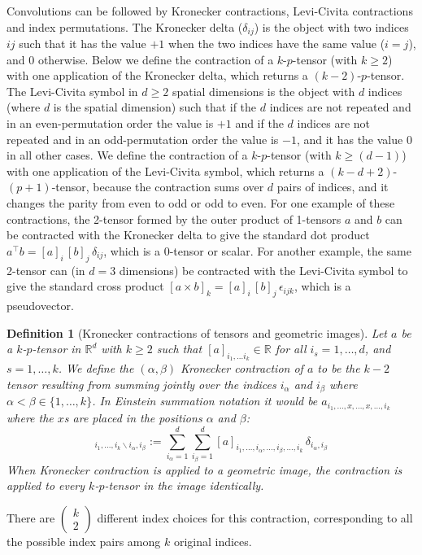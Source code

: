 \documentclass{article}
\theoremstyle{plain}
\newtheorem{definition}{Definition}
\renewcommand{\choose}[2]{\begin{pmatrix}{#1}\\{#2}\end{pmatrix}}
\begin{document}
Convolutions can be followed by Kronecker contractions, Levi-Civita contractions and index permutations.
The Kronecker delta ($\delta_{ij}$) is the object with two indices $ij$ such that it has the value $+1$ when the two indices have the same value ($i=j$), and $0$ otherwise.
Below we define the contraction of a $k$-$p$-tensor (with $k\geq 2$) with one application of the Kronecker delta, which returns a $(k-2)$-$p$-tensor.
The Levi-Civita symbol in $d\geq 2$ spatial dimensions is the object with $d$ indices (where $d$ is the spatial dimension) such that if the $d$ indices are not repeated and in an even-permutation order the value is $+1$ and if the $d$ indices are not repeated and in an odd-permutation order the value is $-1$, and it has the value $0$ in all other cases.
We define the contraction of a $k$-$p$-tensor (with $k\geq (d-1)$) with one application of the Levi-Civita symbol, which returns a $(k-d+2)$-$(p+1)$-tensor, because the contraction sums over $d$ pairs of indices, and it changes the parity from even to odd or odd to even.
For one example of these contractions, the 2-tensor formed by the outer product of 1-tensors $a$ and $b$ can be contracted with the Kronecker delta to give the standard dot product $a^\top b = [a]_i\,[b]_j\,\delta_{ij}$, which is a 0-tensor or scalar.
For another example, the same 2-tensor can (in $d=3$ dimensions) be contracted with the Levi-Civita symbol to give the standard cross product
$[a\times b]_k = [a]_i\,[b]_j\,\epsilon_{ijk}$, which is a pseudovector.

\begin{definition}[Kronecker contractions of tensors and geometric images]
Let $a$ be a $k$-$p$-tensor in $\mathbb R^d$ with $k\geq 2$ such that $[a]_{i_1,\ldots i_k}\in \mathbb R$ for all $i_s = 1,\ldots, d$, and $s=1,\ldots, k$. We define the $(\alpha,\beta)$ Kronecker contraction of $a$ to be the $k-2$ tensor resulting from summing jointly over the indices $i_\alpha$ and $i_\beta$ where $\alpha < \beta \in\{1,\ldots, k\}$. In Einstein summation notation it would be $a_{i_1, \ldots, x, \ldots , x, \ldots, i_k}$ where the $x$s are placed in the positions $\alpha$ and $\beta$:
\begin{equation}
[a^{(\alpha,\beta)}]_{i_1, \ldots, i_k \backslash i_\alpha,i_\beta} := \sum_{i_\alpha=1}^d \sum_{i_\beta=1}^d [a]_{i_1, \ldots, i_\alpha,\ldots,i_\beta,\ldots, i_k}\,\delta_{i_\alpha, i_\beta}
\end{equation}
When Kronecker contraction is applied to a geometric image, the contraction is applied to every $k$-$p$-tensor in the image identically.
\end{definition}
There are $\choose{k}{2}$ different index choices for this contraction, corresponding to all the possible index pairs among $k$ original indices.
\end{document}
